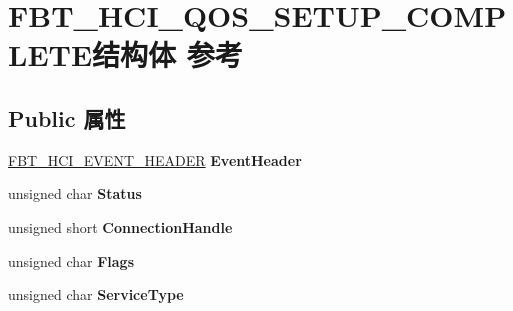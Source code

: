 \hypertarget{struct_f_b_t___h_c_i___q_o_s___s_e_t_u_p___c_o_m_p_l_e_t_e}{}\section{F\+B\+T\+\_\+\+H\+C\+I\+\_\+\+Q\+O\+S\+\_\+\+S\+E\+T\+U\+P\+\_\+\+C\+O\+M\+P\+L\+E\+T\+E结构体 参考}
\label{struct_f_b_t___h_c_i___q_o_s___s_e_t_u_p___c_o_m_p_l_e_t_e}
\subsection*{Public 属性}
\begin{DoxyCompactItemize}
\item 
\mbox{\label{struct_f_b_t___h_c_i___q_o_s___s_e_t_u_p___c_o_m_p_l_e_t_e_aad4c47d2ad1e42eaf6b69781399df673}} 
\hyperlink{struct_f_b_t___h_c_i___e_v_e_n_t___h_e_a_d_e_r}{F\+B\+T\+\_\+\+H\+C\+I\+\_\+\+E\+V\+E\+N\+T\+\_\+\+H\+E\+A\+D\+ER} {\bfseries Event\+Header}
\item 
\mbox{\label{struct_f_b_t___h_c_i___q_o_s___s_e_t_u_p___c_o_m_p_l_e_t_e_a061bb7d244189b4dbc22445155adcf1b}} 
unsigned char {\bfseries Status}
\item 
\mbox{\label{struct_f_b_t___h_c_i___q_o_s___s_e_t_u_p___c_o_m_p_l_e_t_e_a42cfb59b94c1c31c968a594674400e3b}} 
unsigned short {\bfseries Connection\+Handle}
\item 
\mbox{\label{struct_f_b_t___h_c_i___q_o_s___s_e_t_u_p___c_o_m_p_l_e_t_e_acd5bc8104510a2da8d24f6ef7c5494f7}} 
unsigned char {\bfseries Flags}
\item 
\mbox{\label{struct_f_b_t___h_c_i___q_o_s___s_e_t_u_p___c_o_m_p_l_e_t_e_a1989fbd9d488ebdba8dcfaadeeb51946}} 
unsigned char {\bfseries Service\+Type}
\item 
\mbox{\label{struct_f_b_t___h_c_i___q_o_s___s_e_t_u_p___c_o_m_p_l_e_t_e_a010b7a4251a99e2b317ce8c11dbcfe3b}} 

\end{DoxyCompactItemize}
